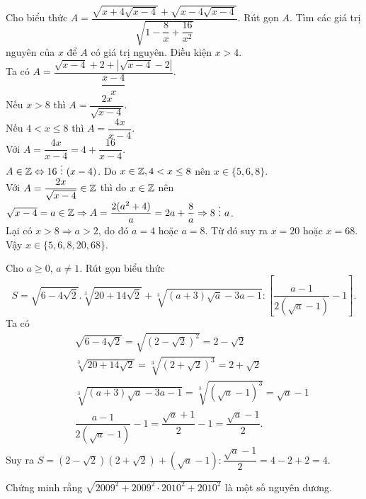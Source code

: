\begin{bt}%
	Cho biểu thức $A=\dfrac{\sqrt{x+4\sqrt{x-4}}+\sqrt{x-4\sqrt{x-4}}}{\sqrt{1-\dfrac{8}{x}+\dfrac{16}{x^2}}}$. Rút gọn $A$. Tìm các giá trị nguyên của $x$ để $A$ có giá trị nguyên.
	\loigiai
	{
		Điều kiện $x>4$.\\
		Ta có $A=\dfrac{\sqrt{x-4}+2+\left|\sqrt{x-4}-2\right|}{\dfrac{x-4}{x}}$.\\
		Nếu $x>8$ thì $A=\dfrac{2x}{\sqrt{x-4}}$.\\
		Nếu $4<x\le 8$ thì $A=\dfrac{4x}{x-4}$.\\
		Với $A=\dfrac{4x}{x-4}=4+\dfrac{16}{x-4}$.\\
		$A\in \Bbb Z\Leftrightarrow 16 \,\, \vdots \,\,(x-4)$. Do $x\in \Bbb Z, 4 <x \le 8$ nên $x\in \{5,6,8\}$.\\
		Với $A=\dfrac{2x}{\sqrt{x-4}}\in \Bbb Z$ thì do $x\in \Bbb Z$ nên $\sqrt{x-4}=a\in \Bbb Z \Rightarrow A=\dfrac{2(a^2+4)}{a}=2a+\dfrac{8}{a}\Rightarrow 8 \,\, \vdots \,\,a$.\\
		Lại có $x>8\Rightarrow a>2$, do đó $a=4$ hoặc $a=8$. Từ đó suy ra $x=20$ hoặc $x=68$.\\
		Vậy $x\in \{5,6,8,20,68\}$.
	}
\end{bt}

\begin{bt}%
	Cho $a \geq 0$, $a \neq 1$. Rút gọn biểu thức
	$$S=\sqrt{{6-4\sqrt{2}}}.\sqrt[3]{{20+14\sqrt{2}}}+\sqrt[3]{{(a+3)\sqrt{a}-3a-1}}:\left[{\dfrac{a-1}{2(\sqrt{a}-1)}-1}\right].$$
	\loigiai
	{
		Ta có
		\allowdisplaybreaks
		\begin{eqnarray*}
			&&\sqrt{{6-4\sqrt{2}}}=\sqrt{{{\left({2-\sqrt{2}}\right)}^2}}=2-\sqrt{2}\\
			&&\sqrt[3]{{20+14\sqrt{2}}}=\sqrt[3]{{{\left({2+\sqrt{2}}\right)}^3}}=2+\sqrt{2}\\
			&&\sqrt[3]{{\left({a+3}\right)\sqrt{a}-3a-1}}=\sqrt[3]{{{\left({\sqrt{a}-1}\right)}^3}}=\sqrt{a}-1\\
			&&\dfrac{a-1}{2\left({\sqrt{a}-1}\right)}-1=\dfrac{\sqrt{a}+1}2-1=\dfrac{\sqrt{a}-1}2.
		\end{eqnarray*}
		Suy ra $S=\left({2-\sqrt{2}}\right)\left({2+\sqrt{2}}\right)+\left({\sqrt{a}-1}\right):\dfrac{\sqrt{a}-1}2=4-2+2=4$.
	}
\end{bt}

\begin{bt}%
	Chứng minh rằng $\sqrt{2009^2+2009^2\cdot 2010^2+2010^2}$ là một số nguyên dương.
\end{bt}

